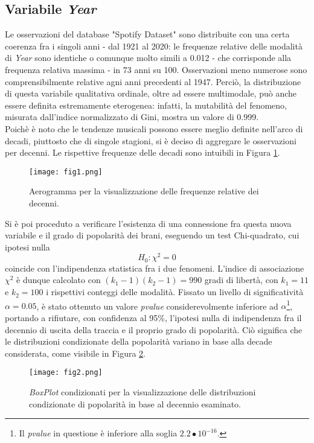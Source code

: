 \documentclass[fleqn,10pt]{SelfArx} %
\begin{document}
\subsection*{Variabile \textit{Year}}\label{year}
Le osservazioni del database "Spotify Dataset" sono distribuite con una certa coerenza fra i singoli anni - dal 1921 al 2020: le frequenze relative delle modalità di \textit{Year} sono identiche o comunque molto simili a 0.012 - che corrisponde alla frequenza relativa massima - in 73 anni su 100. Osservazioni meno numerose sono comprensibilmente relative agni anni precedenti al 1947. Perciò, la distribuzione di questa variabile qualitativa ordinale, oltre ad essere multimodale, può anche essere definita estremamente eterogenea: infatti, la mutabilità del fenomeno, misurata dall'indice normalizzato di Gini, mostra un valore di 0.999.\\
Poichè è noto che le tendenze musicali possono essere meglio definite nell'arco di decadi, piuttosto che di singole stagioni, si è deciso di aggregare le osservazioni per decenni. Le rispettive frequenze delle decadi sono intuibili in Figura \ref{fig:fig1}. 
\begin{figure}[H]
    \centering
    \texttt{[image: fig1.png]}
    \caption{Aerogramma per la visualizzazione delle frequenze relative dei decenni.}
    \label{fig:fig1}
\end{figure}
Si è poi proceduto a verificare l'esistenza di una connessione fra questa nuova variabile e il grado di popolarità dei brani, eseguendo un test Chi-quadrato, cui ipotesi nulla
\begin{equation}
  H_0:\chi^2=0  
\end{equation}
coincide con l'indipendenza statistica fra i due fenomeni. L'indice di associazione $\chi^2$ è dunque calcolato con $(k_1-1)(k_2-1)=990$ gradi di libertà, con $k_1=11$ e $k_2=100$ i rispettivi conteggi delle modalità. Fissato un livello di significatività $\alpha=0.05$, è stato ottenuto un valore \textit{pvalue} considerevolmente inferiore ad $\alpha$\footnote{Il \textit{pvalue} in questione è inferiore alla soglia $2.2\bullet10^{-16}$.}, portando a rifiutare, con confidenza al 95\%, l'ipotesi nulla di indipendenza fra il decennio di uscita della traccia e il proprio grado di popolarità. Ciò significa che le distribuzioni condizionate della popolarità variano in base alla decade considerata, come visibile in Figura \ref{fig:fig2}. 
\begin{figure}[H]
    \centering
    \texttt{[image: fig2.png]}
    \caption{\textit{BoxPlot} condizionati per la visualizzazione delle distribuzioni condizionate di popolarità in base al decennio esaminato.}
    \label{fig:fig2}
\end{figure}
\end{document}
